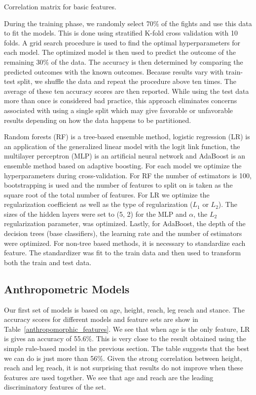 \begin{center}
\begin{table}[h]

\caption{Correlation matrix for basic features.}
\label{corr_mat}
\end{table}
\end{center}

During the training phase, we randomly select 70\% of the fights
and use this data to fit the models. This is done using
stratified K-fold cross validation with 10 folds. A grid search
procedure is used to find the optimal hyperparameters for each
model. The optimized model is then used to predict the outcome
of the remaining 30\% of the data. The accuracy is then determined
by comparing the predicted outcomes with the known outcomes.
Because results vary with train-test split, we shuffle the
data and repeat the procedure above ten times. The average
of these ten accuracy scores are then reported.
While using the
test data more than once is considered bad practice, this approach eliminates
concerns associated with using a single split which may give
favorable or unfavorable results depending on how the data
happens to be partitioned.

Random forests (RF) is a tree-based ensemble method,
logistic regression (LR) is an application of the generalized
linear model with the logit link function, the multilayer perceptron (MLP)
is an artificial neural network and AdaBoost is
an ensemble method based on adaptive boosting.
For each model we optimize the hyperparameters
during cross-validation. For RF the
number of estimators is 100, bootstrapping is used
and the number of features to split on is taken
as the square root of the total number of features.
For LR we optimize the regularization coefficient
as well as the type of regularization ($L_1$ or $L_2$).
The sizes of the hidden layers were set to (5, 2) for
the MLP and $\alpha$, the $L_2$ regularization parameter, was optimized.
Lastly, for AdaBoost, the depth of the decision trees
(base classifiers), the learning rate and the number
of estimators were optimized.
For non-tree based methods, it is necessary to standardize
each feature. The standardizer was fit to the train data
and then used to transform both the train and test data.

\subsection*{Anthropometric Models}

Our first set of models is based on age, height,
reach, leg reach and stance. The accuracy scores
for different models and feature sets are show
in Table~\ref{anthropomorphic_features}.
We see that when age is the only feature, LR is gives
an accuracy of 55.6\%. This is very close to the result obtained using the simple
rule-based model in the previous section. The table
suggests that the best we can do is just more than
56\%. Given the strong correlation between height, reach
and leg reach, it is not surprising that results do not
improve when these features are used together. We see that
age and reach are the leading discriminatory features of the set.

